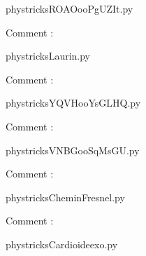 
    \newcommand{\CaptionFigROAOooPgUZIt}{<+Type your caption here+>}
    \begin{center}
        
    \end{center}
    phystricksROAOooPgUZIt.py

    Comment : 

    \clearpage
    


    \newcommand{\CaptionFigLaurin}{<+Type your caption here+>}
    \begin{center}
        
    \end{center}
    phystricksLaurin.py

    Comment : 

    \clearpage
    


    \newcommand{\CaptionFigYQVHooYsGLHQ}{<+Type your caption here+>}
    \begin{center}
        
    \end{center}
    phystricksYQVHooYsGLHQ.py

    Comment : 

    \clearpage
    


    \newcommand{\CaptionFigVNBGooSqMsGU}{<+Type your caption here+>}
    \begin{center}
        
    \end{center}
    phystricksVNBGooSqMsGU.py

    Comment : 

    \clearpage
    


    \newcommand{\CaptionFigCheminFresnel}{<+Type your caption here+>}
    \begin{center}
        
    \end{center}
    phystricksCheminFresnel.py

    Comment : 

    \clearpage
    


    \newcommand{\CaptionFigCardioideexo}{<+Type your caption here+>}
    \begin{center}
        
    \end{center}
    phystricksCardioideexo.py

